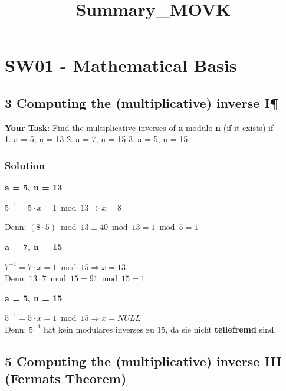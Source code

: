 \documentclass[11pt]{article}
\title{Summary\_MOVK}
\begin{document}
    
    \maketitle
    
    

    

\tableofcontents

    
\newpage

    \hypertarget{sw01---mathematical-basis}{%
\section{SW01 - Mathematical Basis}\label{sw01---mathematical-basis}}

    \hypertarget{computing-the-multiplicative-inverse-i}{%
\subsection{3 Computing the (multiplicative) inverse
I¶}\label{computing-the-multiplicative-inverse-i}}

\textbf{Your Task}: Find the multiplicative inverses of \textbf{a}
modulo \textbf{n} (if it exists) if\\
1. a = 5, n = 13 2. a = 7, n = 15 3. a = 5, n = 15

    \hypertarget{solution}{%
\subsubsection{Solution}\label{solution}}

\textbf{a = 5, n = 13}

\(5^{-1} = 5 \cdot x = 1 \bmod 13 \Rightarrow x = 8\)

Denn: \((8 \cdot 5) \bmod 13 \equiv 40 \bmod 13 = 1 \bmod 5 = 1\)

\textbf{a = 7, n = 15}

\(7^{-1} = 7 \cdot x = 1 \bmod 15 \Rightarrow x = 13\)\\
Denn: \(13 \cdot 7 \bmod 15 = 91 \bmod 15 = 1\)

\textbf{a = 5, n = 15}

\(5^{-1} = 5 \cdot x = 1 \bmod 15 \Rightarrow x = NULL\)\\
Denn: \(5^{-1}\) hat kein modulares inverses zu 15, da sie nicht
\textbf{teilefremd} sind.

    \hypertarget{computing-the-multiplicative-inverse-iii-fermats-theorem}{%
\subsection{5 Computing the (multiplicative) inverse III (Fermats
Theorem)}\label{computing-the-multiplicative-inverse-iii-fermats-theorem}}
\end{document}
